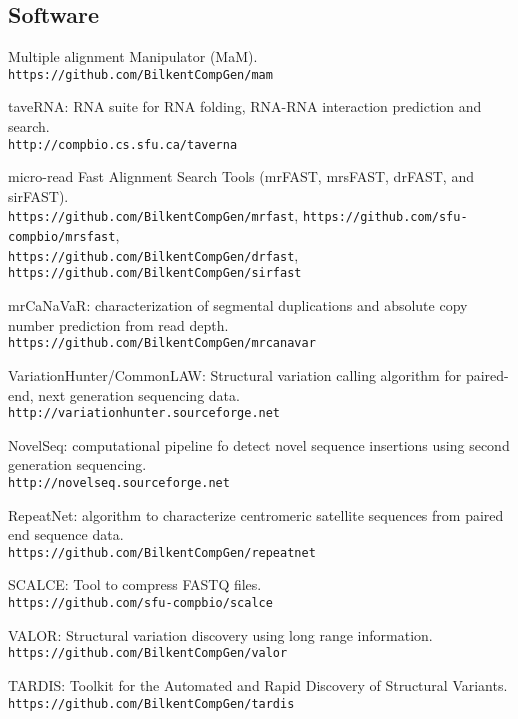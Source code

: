 \subsection{\small \sc Software}
\begin{list2}
\item
  Multiple alignment Manipulator (MaM).\\
  {\tt https://github.com/BilkentCompGen/mam}
\item
  taveRNA: RNA suite for RNA folding, RNA-RNA interaction prediction and search.\\
  {\tt http://compbio.cs.sfu.ca/taverna}

\item
  micro-read Fast Alignment Search Tools (mrFAST, mrsFAST, drFAST, and sirFAST).\\
  {\tt https://github.com/BilkentCompGen/mrfast},
  {\tt https://github.com/sfu-compbio/mrsfast},\\
  {\tt https://github.com/BilkentCompGen/drfast},
  {\tt https://github.com/BilkentCompGen/sirfast}
\item
  mrCaNaVaR: characterization of segmental duplications and absolute copy number prediction from read depth.\\
  {\tt https://github.com/BilkentCompGen/mrcanavar}
\item
  VariationHunter/CommonLAW: Structural variation calling algorithm for paired-end, next
  generation sequencing data.\\
  {\tt http://variationhunter.sourceforge.net}
\item
  NovelSeq: computational pipeline fo detect novel sequence insertions using second generation sequencing.\\
  {\tt http://novelseq.sourceforge.net}
\item
  RepeatNet: algorithm to characterize centromeric satellite sequences from paired end sequence data.\\
  {\tt https://github.com/BilkentCompGen/repeatnet}
\item
  SCALCE: Tool to compress FASTQ files. \\
  {\tt https://github.com/sfu-compbio/scalce}
\item
  VALOR: Structural variation discovery using long range information.\\
  {\tt https://github.com/BilkentCompGen/valor}
\item
  TARDIS: Toolkit for the Automated and Rapid Discovery of Structural Variants.\\
  {\tt https://github.com/BilkentCompGen/tardis}
\end{list2}







